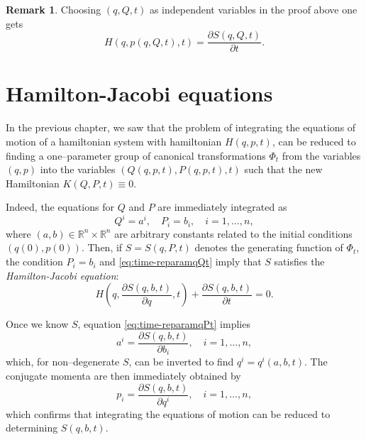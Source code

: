 \documentclass[english,fontsize=11pt,paper=b5]{scrbook}
\numberwithin{equation}{chapter}
\theoremstyle{definition}
\newtheorem{remark}{Remark}[chapter]
\begin{document}
    \begin{remark}\label{rmk:genfnhamflowct}
      Choosing $(q,Q,t)$ as independent variables in the proof above one gets
      \begin{equation}
        H(q, p(q,Q,t), t) = \frac{\partial S(q,Q,t)}{\partial t}.
      \end{equation}
    \end{remark}

    \section{Hamilton-Jacobi equations}

    In the previous chapter, we saw that the problem of integrating the equations of motion of a hamiltonian system with hamiltonian $H(q,p,t)$, can be reduced to finding a one--parameter group of canonical transformations $\Phi_t$ from the variables $(q,p)$ into the variables $(Q(q,p,t), P(q,p,t), t)$ such that the new Hamiltonian $K(Q,P,t) \equiv 0$.

    Indeed, the equations for $Q$ and $P$ are immediately integrated as
    \begin{equation}
      Q^i = a^i, \quad
      P_i = b_i, \quad
      i = 1,\ldots,n,
    \end{equation}
    where $(a,b)\in\mathbb{R}^{n}\times\mathbb{R}^n$ are arbitrary constants related to the initial conditions $(q(0), p(0))$.
    Then, if $S = S(q,P,t)$ denotes the generating function of $\Phi_t$, the condition $P_i=b_i$ and \eqref{eq:time-reparamqQt} imply that $S$ satisfies the \emph{Hamilton-Jacobi equation}:
    \begin{equation}\label{eq:Hamilton-Jacobi}
      H\left(q, \frac{\partial S(q,b,t)}{\partial q}, t\right) + \frac{\partial S(q,b,t)}{\partial t} = 0.
    \end{equation}

    Once we know $S$, equation \eqref{eq:time-reparamqPt} implies
    \begin{equation}
      a^i = \frac{\partial S(q,b,t)}{\partial b_i}, \quad i =1,\ldots,n,
    \end{equation}
    which, for non--degenerate $S$, can be inverted to find $q^i = q^i(a,b,t)$.
    The conjugate momenta are then immediately obtained by
    \begin{equation}
      p_i = \frac{\partial S(q,b,t)}{\partial q^i}, \quad i =1,\ldots,n,
    \end{equation}
    which confirms that integrating the equations of motion can be reduced to determining $S(q,b,t)$.
\end{document}
